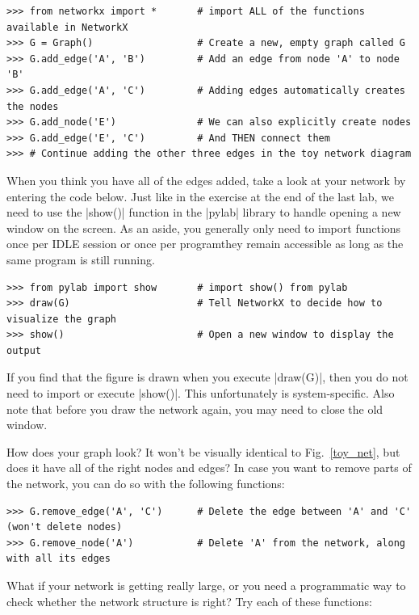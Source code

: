 \documentclass{article}
\begin{document}
\begin{Verbatim}[samepage=true]
>>> from networkx import *       # import ALL of the functions available in NetworkX
>>> G = Graph()                  # Create a new, empty graph called G
>>> G.add_edge('A', 'B')         # Add an edge from node 'A' to node 'B'
>>> G.add_edge('A', 'C')         # Adding edges automatically creates the nodes
>>> G.add_node('E')              # We can also explicitly create nodes
>>> G.add_edge('E', 'C')         # And THEN connect them
>>> # Continue adding the other three edges in the toy network diagram
\end{Verbatim}

When you think you have all of the edges added, take a look at your network by entering the code below.  Just like in the exercise at the end of the last lab, we need to use the |show()| function in the |pylab| library to handle opening a new window on the screen.  As an aside, you generally only need to import functions once per IDLE session or once per program\textemdash they remain accessible as long as the same program is still running.

\begin{Verbatim}[samepage=true]
>>> from pylab import show       # import show() from pylab
>>> draw(G)                      # Tell NetworkX to decide how to visualize the graph
>>> show()                       # Open a new window to display the output
\end{Verbatim}

If you find that the figure is drawn when you execute |draw(G)|, then you do not need to import or execute |show()|.  This unfortunately is system-specific. Also note that before you draw the network again, you may need to close the old window.

How does your graph look?  It won't be visually identical to Fig.~\ref{toy_net}, but does it have all of the right nodes 
and edges? In case you want to remove parts of the network, you can do so with the following functions:

\begin{Verbatim}[samepage=true]
>>> G.remove_edge('A', 'C')      # Delete the edge between 'A' and 'C' (won't delete nodes)
>>> G.remove_node('A')           # Delete 'A' from the network, along with all its edges
\end{Verbatim}
\pagebreak
What if your network is getting really large, or you need a programmatic way to check whether the network structure is right?  
Try each of these functions:
\end{document}
